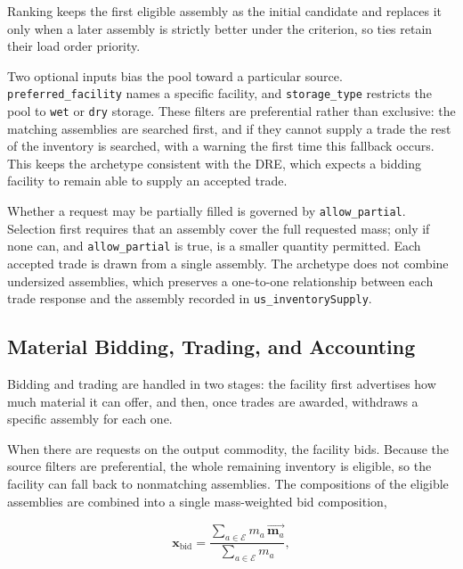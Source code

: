 Ranking keeps the first eligible assembly as the initial candidate and replaces it
only when a later assembly is strictly better under the criterion, so ties retain their
load order priority.

Two optional inputs bias the pool toward a particular source.
\texttt{preferred\_facility} names a specific facility, and \texttt{storage\_type}
restricts the pool to \texttt{wet} or \texttt{dry} storage. These filters are
preferential rather than exclusive: the matching assemblies are searched first,
and if they cannot supply a trade the rest of the inventory is searched, with a
warning the first time this fallback occurs. This keeps the archetype consistent
with the \gls{DRE}, which expects a bidding facility to remain able to supply an
accepted trade.

Whether a request may be partially filled is governed by \texttt{allow\_partial}.
Selection first requires that an assembly cover the full requested mass; only if none
can, and \texttt{allow\_partial} is true, is a smaller quantity permitted.
Each accepted trade is drawn from a single assembly. The archetype does not combine
undersized assemblies, which preserves a one-to-one relationship between each trade
response and the assembly recorded in \texttt{us\_inventorySupply}.

\subsection{Material Bidding, Trading, and Accounting}
\label{subsec:us-inventory-accounting}

Bidding and trading are handled in two stages: the facility first advertises how
much material it can offer, and then, once trades are awarded, withdraws a
specific assembly for each one.

When there are requests on the output commodity, the facility bids. Because the
source filters are preferential, the whole remaining inventory is eligible, so the
facility can fall back to nonmatching assemblies. The compositions of the eligible
assemblies are combined into a single mass-weighted bid composition,

\begin{equation}
    \mathbf{x}_{\mathrm{bid}}
    =
    \frac{
        \displaystyle\sum_{a \in \mathcal{E}} m_a\,\vec{\mathbf{m}_a}
    }{
        \displaystyle\sum_{a \in \mathcal{E}} m_a
    },
    \label{eq:usinv-bid-composition}
\end{equation}

